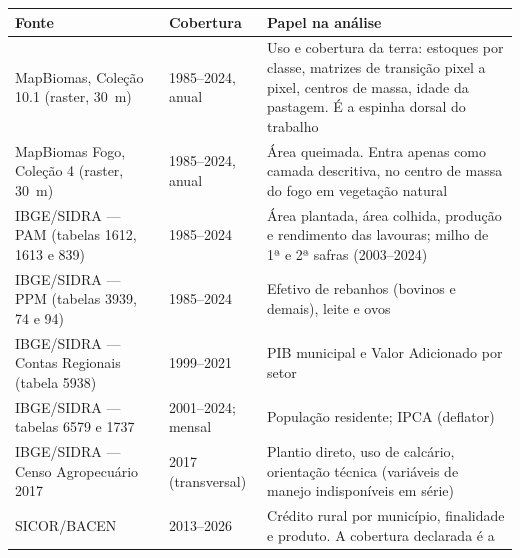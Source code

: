 \begin{quadro}[p]
\centering
\caption[Fontes de dados: cobertura e papel na análise]{Fontes de dados: cobertura temporal e papel na análise.}
\label{quadro:fontes}
\footnotesize
\setlength{\defaultaddspace}{2pt}
\begin{tabular}{p{3.6cm}p{2.4cm}p{7.6cm}}
\toprule
\textbf{Fonte} & \textbf{Cobertura} & \textbf{Papel na análise} \\
\midrule
MapBiomas, Coleção 10.1 (raster, 30~m) & 1985--2024, anual &
Uso e cobertura da terra: estoques por classe, matrizes de transição
pixel a pixel, centros de massa, idade da pastagem. É a espinha dorsal
do trabalho \\
\addlinespace
MapBiomas Fogo, Coleção 4 (raster, 30~m) & 1985--2024, anual &
Área queimada. Entra apenas como camada descritiva, no centro de massa do
fogo em vegetação natural \\
\addlinespace
IBGE/SIDRA --- PAM (tabelas 1612, 1613 e 839) & 1985--2024 &
Área plantada, área colhida, produção e rendimento das lavouras; milho de
1ª e 2ª safras (2003--2024) \\
\addlinespace
IBGE/SIDRA --- PPM (tabelas 3939, 74 e 94) & 1985--2024 &
Efetivo de rebanhos (bovinos e demais), leite e ovos \\
\addlinespace
IBGE/SIDRA --- Contas Regionais (tabela 5938) & 1999--2021 &
PIB municipal e Valor Adicionado por setor \\
\addlinespace
IBGE/SIDRA --- tabelas 6579 e 1737 & 2001--2024; mensal &
População residente; IPCA (deflator) \\
\addlinespace
IBGE/SIDRA --- Censo Agropecuário 2017 & 2017 (transversal) &
Plantio direto, uso de calcário, orientação técnica (variáveis de
manejo indisponíveis em série) \\
\addlinespace
SICOR/BACEN & 2013--2026 &
Crédito rural por município, finalidade e produto. A cobertura declarada é a

\end{tabular}
\end{quadro}
